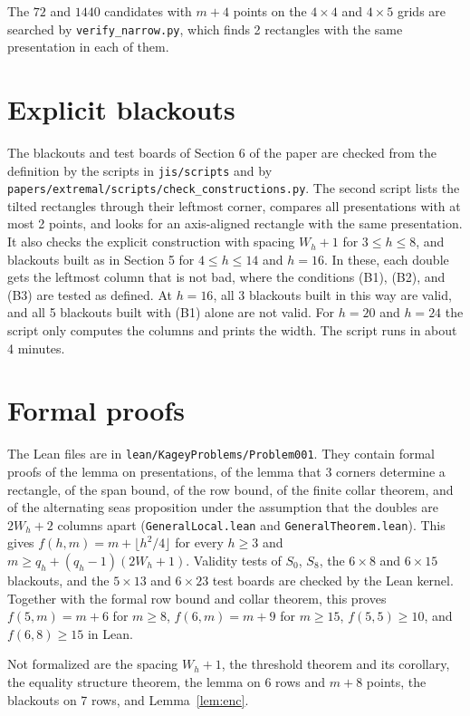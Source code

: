 \documentclass[11pt]{article}
\begin{document}
The $72$ and $1440$ candidates with $m+4$ points on the $4\times4$ and $4\times5$ grids are
searched by \nolinkurl{verify_narrow.py}, which finds 2 rectangles with the same
presentation in each of them.

\section{Explicit blackouts}

The blackouts and test boards of Section 6 of the paper are checked from the definition by
the scripts in \nolinkurl{jis/scripts} and by
\nolinkurl{papers/extremal/scripts/check_constructions.py}. The second script lists the
tilted rectangles through their leftmost corner, compares all presentations with at most 2
points, and looks for an axis-aligned rectangle with the same presentation. It also checks
the explicit construction with spacing $W_h+1$ for $3\le h\le8$, and blackouts built as in
Section 5 for $4\le h\le14$ and $h=16$. In these, each double gets the leftmost column that
is not bad, where the conditions (B1), (B2), and (B3) are tested as defined. At $h=16$, all 3
blackouts built in this way are valid, and all 5 blackouts built with (B1) alone are not
valid. For $h=20$ and $h=24$ the script only computes the columns and prints the width. The
script runs in about 4 minutes.

\section{Formal proofs}

The Lean files are in \nolinkurl{lean/KageyProblems/Problem001}. They contain formal proofs
of the lemma on presentations, of the lemma that 3 corners determine a rectangle, of the
span bound, of the row bound, of the finite collar theorem, and of the alternating seas
proposition under the assumption that the doubles are $2W_h+2$ columns apart
(\nolinkurl{GeneralLocal.lean} and \nolinkurl{GeneralTheorem.lean}). This gives
$f(h,m)=m+\lfloor h^2/4\rfloor$ for every $h\ge3$ and
$m\ge q_h+(q_h-1)(2W_h+1)$. Validity tests of $S_0$, $S_8$, the $6\times8$ and $6\times15$
blackouts, and the $5\times13$ and $6\times23$ test boards are checked by the Lean kernel.
Together with the formal row bound and collar theorem, this proves $f(5,m)=m+6$ for
$m\ge8$, $f(6,m)=m+9$ for $m\ge15$, $f(5,5)\ge10$, and $f(6,8)\ge15$ in Lean.

Not formalized are the spacing $W_h+1$, the threshold theorem and its corollary, the
equality structure theorem, the lemma on 6 rows and $m+8$ points, the blackouts on 7 rows,
and Lemma~\ref{lem:enc}.
\end{document}
